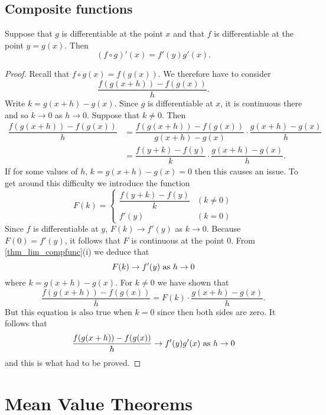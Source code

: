\documentclass[10pt, a4paper]{article}
\begin{document}
\subsection{Composite functions}
\begin{theorem}
    Suppose that $g$ is differentiable at the point $x$ and that $f$ is differentiable at the point $y = g(x)$. Then
    \[
    (f \circ g)'(x) = f'(y)g'(x).
    \]
    \begin{proof}
        Recall that $f \circ g(x) = f(g(x))$. We therefore have to consider
        \[
        \dfrac{f(g(x + h)) - f(g(x))}{h}.
        \]
        Write $k = g(x + h) - g(x)$. Since $g$ is differentiable at $x$, it is continuous there and so $k \rightarrow 0$ as $h \rightarrow 0$. Suppose that $k \neq 0$. Then
        \begin{align*}
            \dfrac{f(g(x + h)) - f(g(x))}{h} &= \dfrac{f(g(x + h)) - f(g(x))}{g(x + h) - g(x)} \cdot \dfrac{g(x + h) - g(x)}{h} \\
            &= \dfrac{f(y + k) - f(y)}{k} \cdot \dfrac{g(x + h) - g(x)}{h}.
        \end{align*}
        If for some values of $h$, $k = g(x + h) - g(x) = 0$ then this causes an issue. To get around this difficulty we introduce the function
        \[
        F(k) =
        \begin{cases}
            \dfrac{f(y + k) - f(y)}{k} &(k \neq 0) \\
            f'(y) &(k = 0)
        \end{cases}
        \]
        Since $f$ is differentiable at $y$, $F(k) \rightarrow f'(y)$ as $k \rightarrow 0$. Because $F(0) = f'(y)$, it follows that $F$ is continuous at the point $0$. From \autoref{thm_lim_compfunc}(i) we deduce that
        \[
        F(k) \rightarrow f'(y) \textnormal{ as } h \rightarrow 0
        \]
        where $k = g(x + h) - g(x)$.
        For $k \neq 0$ we have shown that
        \[
        \dfrac{f(g(x + h)) - f(g(x))}{h} = F(k) \cdot \dfrac{g(x + h) - g(x)}{h}.
        \]
        But this equation is also true when $k = 0$ since then both sides are zero. It follows that
        \[
        \dfrac{f(g(x + h)) - f(g(x))}{h} \rightarrow f'(y)g'(x) \textnormal{ as } h \rightarrow 0
        \]
        and this is what had to be proved. 
    \end{proof}
\end{theorem}

\newpage

\section{Mean Value Theorems}
\end{document}
